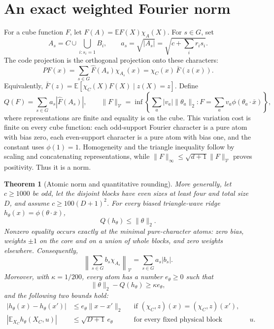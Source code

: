 \documentclass[11pt]{article}
\newtheorem{theorem}{Theorem}
\newcommand{\E}{\mathbb E}
\newcommand{\cV}{\mathcal V}
\begin{document}
\section{An exact weighted Fourier norm}

For a cube function $F$, let $\widehat F(A)=\E F(X)\chi_A(X)$.
For $s\in G$, set
\[
 A_s=C\cup\bigcup_{i:s_i=1}B_i,\qquad
 a_s=\sqrt{|A_s|}=\sqrt{c+\sum_i r_i s_i}.
\]
The code projection is the orthogonal projection onto these characters:
\begin{equation}\label{eq:projection}
 PF(x)=\sum_{s\in G}\widehat F(A_s)\chi_{A_s}(x)
      =\chi_C(x)\,\bar F(z(x)).
\end{equation}
Equivalently,
$\bar F(z)=\E[\chi_C(X)F(X)\mid z(X)=z]$.
Define
\[
 Q(F)=\sum_{s\in G}a_s|\widehat F(A_s)|,
 \qquad
 \|F\|_{\cV}=\inf\left\{\sum_a|v_a|\|\theta_a\|_2:
          F=\sum_a v_a\phi(\theta_a\cdot\bar x)\right\},
\]
where representations are finite and equality is on the cube. This
variation cost is finite on every cube function: each odd-support
Fourier character is a pure atom with bias zero, each even-support
character is a pure atom with bias one, and the constant uses
$\phi(1)=1$. Homogeneity and the triangle inequality follow by scaling
and concatenating representations, while
$\|F\|_\infty\le\sqrt{d+1}\|F\|_{\cV}$ proves positivity. Thus it is
a norm.

\begin{theorem}[Atomic norm and quantitative rounding]\label{thm:atomic}
More generally, let $c\ge1000$ be odd, let the disjoint blocks have even
sizes at least four and total size $D$, and assume
$c\ge100(D+1)^2$. For every biased triangle-wave ridge
$h_\theta(x)=\phi(\theta\cdot\bar x)$,
\begin{equation}\label{eq:atomic}
 Q(h_\theta)\le\|\theta\|_2.
\end{equation}
Nonzero equality occurs exactly at the minimal pure-character atoms:
zero bias, weights $\pm1$ on the core and on a union of whole blocks,
and zero weights elsewhere. Consequently,
\begin{equation}\label{eq:exactnorm}
 \left\|\sum_{s\in G} b_s\chi_{A_s}\right\|_{\cV}
       =\sum_{s\in G}a_s|b_s|.
\end{equation}
Moreover, with $\kappa=1/200$, every atom has a number $e_\theta\ge0$
such that
\begin{equation}\label{eq:rounding}
 \|\theta\|_2-Q(h_\theta)\ge\kappa e_\theta,
\end{equation}
and the following two bounds hold:
\begin{align}
 |h_\theta(x)-h_\theta(x')|
   &\le e_\theta\|x-x'\|_2
   &&\text{if }(\chi_C,z)(x)=(\chi_C,z)(x'),\label{eq:fiberlip}\\
 |\E_{X_C}h_\theta(X_C,u)|
   &\le\sqrt{D+1}\,e_\theta
   &&\text{for every fixed physical block assignment }u.
   \label{eq:coremean}
\end{align}
\end{theorem}
\end{document}
